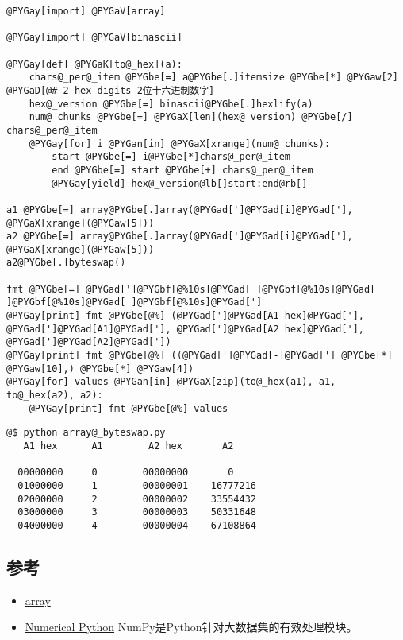 \documentclass[a4paper,10pt,english]{manual}
\begin{document}
\begin{Verbatim}[commandchars=@\[\]]
@PYGay[import] @PYGaV[array]

@PYGay[import] @PYGaV[binascii]

@PYGay[def] @PYGaK[to@_hex](a):
    chars@_per@_item @PYGbe[=] a@PYGbe[.]itemsize @PYGbe[*] @PYGaw[2] @PYGaD[@# 2 hex digits 2位十六进制数字]
    hex@_version @PYGbe[=] binascii@PYGbe[.]hexlify(a)
    num@_chunks @PYGbe[=] @PYGaX[len](hex@_version) @PYGbe[/] chars@_per@_item
    @PYGay[for] i @PYGan[in] @PYGaX[xrange](num@_chunks):
        start @PYGbe[=] i@PYGbe[*]chars@_per@_item
        end @PYGbe[=] start @PYGbe[+] chars@_per@_item
        @PYGay[yield] hex@_version@lb[]start:end@rb[]

a1 @PYGbe[=] array@PYGbe[.]array(@PYGad[']@PYGad[i]@PYGad['], @PYGaX[xrange](@PYGaw[5]))
a2 @PYGbe[=] array@PYGbe[.]array(@PYGad[']@PYGad[i]@PYGad['], @PYGaX[xrange](@PYGaw[5]))
a2@PYGbe[.]byteswap()

fmt @PYGbe[=] @PYGad[']@PYGbf[@%10s]@PYGad[ ]@PYGbf[@%10s]@PYGad[ ]@PYGbf[@%10s]@PYGad[ ]@PYGbf[@%10s]@PYGad[']
@PYGay[print] fmt @PYGbe[@%] (@PYGad[']@PYGad[A1 hex]@PYGad['], @PYGad[']@PYGad[A1]@PYGad['], @PYGad[']@PYGad[A2 hex]@PYGad['], @PYGad[']@PYGad[A2]@PYGad['])
@PYGay[print] fmt @PYGbe[@%] ((@PYGad[']@PYGad[-]@PYGad['] @PYGbe[*] @PYGaw[10],) @PYGbe[*] @PYGaw[4])
@PYGay[for] values @PYGan[in] @PYGaX[zip](to@_hex(a1), a1, to@_hex(a2), a2):
    @PYGay[print] fmt @PYGbe[@%] values
\end{Verbatim}

\begin{Verbatim}[commandchars=@\[\]]
@$ python array@_byteswap.py
   A1 hex      A1        A2 hex       A2
 ---------- ---------- ---------- ----------
  00000000     0        00000000       0
  01000000     1        00000001    16777216
  02000000     2        00000002    33554432
  03000000     3        00000003    50331648
  04000000     4        00000004    67108864
\end{Verbatim}


\subsection{参考}
\begin{itemize}
\item {} 
\href{http://docs.python.org/library/array.html}{array}

\item {} 
\href{http://www.scipy.org/}{Numerical Python} NumPy是Python针对大数据集的有效处理模块。

\end{itemize}
\end{document}
